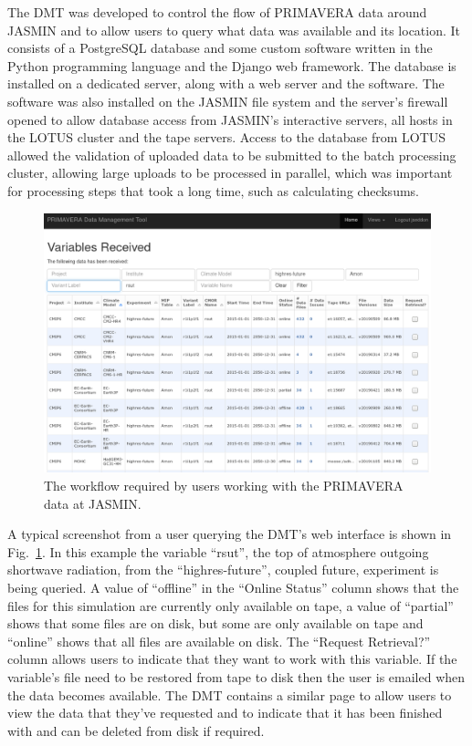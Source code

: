 \documentclass[gmd, manuscript]{copernicus}
\begin{document}
The DMT was developed to control the flow of PRIMAVERA data around JASMIN and to allow users to query what data was available and its location. It consists of a PostgreSQL database and some custom software written in the Python programming language and the Django web framework. The database is installed on a dedicated server, along with a web server and the software. The software was also installed on the JASMIN file system and the server's firewall opened to allow database access from JASMIN's interactive servers, all hosts in the LOTUS cluster and the tape servers. Access to the database from LOTUS allowed the validation of uploaded data to be submitted to the batch processing cluster, allowing large uploads to be processed in parallel, which was important for processing steps that took a long time, such as calculating checksums.

\begin{figure}[t]
	\includegraphics[width=12cm]{fig03.png}
	\caption{The workflow required by users working with the PRIMAVERA data at JASMIN.}
	\label{dmt_query}
\end{figure}

A typical screenshot from a user querying the DMT's web interface is shown in Fig.~\ref{dmt_query}. In this example the variable ``rsut'', the top of atmosphere outgoing shortwave radiation, from the ``highres-future'', coupled future, experiment is being queried. A value of ``offline'' in the ``Online Status'' column shows that the files for this simulation are currently only available on tape, a value of ``partial'' shows that some files are on disk, but some are only available on tape and ``online'' shows that all files are available on disk. The ``Request Retrieval?'' column allows users to indicate that they want to work with this variable. If the variable's file need to be restored from tape to disk then the user is emailed when the data becomes available. The DMT contains a similar page to allow users to view the data that they've requested and to indicate that it has been finished with and can be deleted from disk if required.
\end{document}
